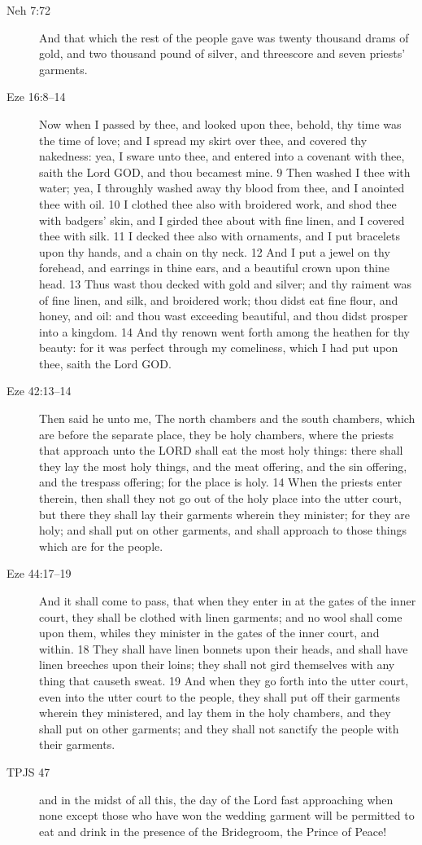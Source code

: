 \begin{description}
		\item[Neh 7:72] And that which the rest of the people gave was twenty thousand drams of gold, and two thousand pound of silver, and threescore and seven priests' garments.
		\item[Eze 16:8--14] Now when I passed by thee, and looked upon thee, behold, thy time was the time of love; and I spread my skirt over thee, and covered thy nakedness: yea, I sware unto thee, and entered into a covenant with thee, saith the Lord GOD, and thou becamest mine. 9 Then washed I thee with water; yea, I throughly washed away thy blood from thee, and I anointed thee with oil. 10 I clothed thee also with broidered work, and shod thee with badgers' skin, and I girded thee about with fine linen, and I covered thee with silk. 11 I decked thee also with ornaments, and I put bracelets upon thy hands, and a chain on thy neck. 12 And I put a jewel on thy forehead, and earrings in thine ears, and a beautiful crown upon thine head. 13 Thus wast thou decked with gold and silver; and thy raiment was of fine linen, and silk, and broidered work; thou didst eat fine flour, and honey, and oil: and thou wast exceeding beautiful, and thou didst prosper into a kingdom. 14 And thy renown went forth among the heathen for thy beauty: for it was perfect through my comeliness, which I had put upon thee, saith the Lord GOD.
		\item[Eze 42:13--14] Then said he unto me, The north chambers and the south chambers, which are before the separate place, they be holy chambers, where the priests that approach unto the LORD shall eat the most holy things: there shall they lay the most holy things, and the meat offering, and the sin offering, and the trespass offering; for the place is holy. 14 When the priests enter therein, then shall they not go out of the holy place into the utter court, but there they shall lay their garments wherein they minister; for they are holy; and shall put on other garments, and shall approach to those things which are for the people.
		\item[Eze 44:17--19] And it shall come to pass, that when they enter in at the gates of the inner court, they shall be clothed with linen garments; and no wool shall come upon them, whiles they minister in the gates of the inner court, and within. 18 They shall have linen bonnets upon their heads, and shall have linen breeches upon their loins; they shall not gird themselves with any thing that causeth sweat. 19 And when they go forth into the utter court, even into the utter court to the people, they shall put off their garments wherein they ministered, and lay them in the holy chambers, and they shall put on other garments; and they shall not sanctify the people with their garments.
		\item[TPJS 47] and in the midst of all this, the day of the Lord fast approaching when none except those who have won the wedding garment will be permitted to eat and drink in the presence of the Bridegroom, the Prince of Peace!
		\end{description}

